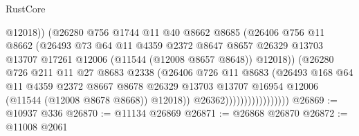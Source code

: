 \begin{lexlean}{RustCore}
\begin{coremodule}
                                      @12018))
                                  (@26280
                                    @756
                                    @1744
                                    @11
                                    @40
                                    @8662
                                    @8685
                                    (@26406
                                      @756
                                      @11
                                      @8662
                                      (@26493
                                        @73
                                        @64
                                        @11
                                        @4359
                                        @2372
                                        @8647
                                        @8657
                                        @26329
                                        @13703
                                        @13707
                                        @17261
                                        @12006
                                        (@11544 (@12008 @8657 @8648))
                                        @12018))
                                    (@26280
                                      @726
                                      @211
                                      @11
                                      @27
                                      @8683
                                      @2338
                                      (@26406
                                        @726
                                        @11
                                        @8683
                                        (@26493
                                          @168
                                          @64
                                          @11
                                          @4359
                                          @2372
                                          @8667
                                          @8678
                                          @26329
                                          @13703
                                          @13707
                                          @16954
                                          @12006
                                          (@11544 (@12008 @8678 @8668))
                                          @12018))
                                      @26362)))))))))))))))))
@26869 := @10937 @336
@26870 := @11134 @26869
@26871 := @26868 @26870
@26872 := @11008 @2061

\end{coremodule}
\end{lexlean}
